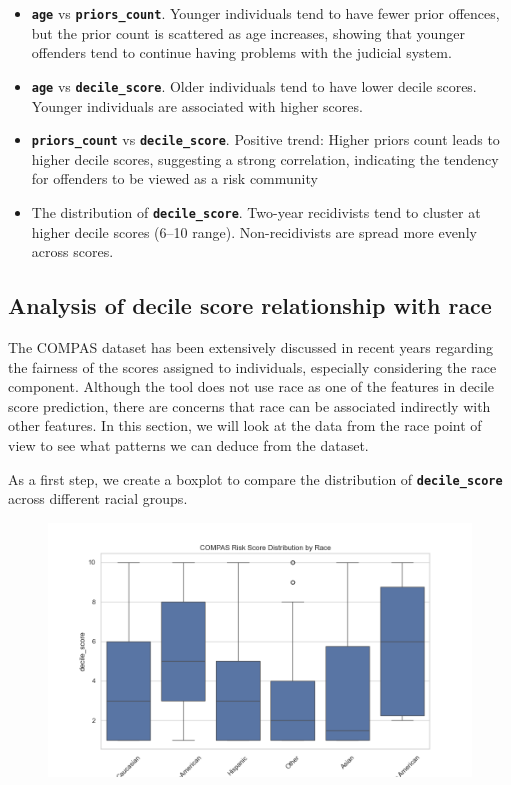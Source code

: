 \begin{itemize}
	\item \textbf{\texttt{age}} vs \textbf{\texttt{priors\_count}}. Younger individuals tend to have fewer prior offences, but the prior count is scattered as age increases, showing that younger offenders tend to continue having problems with the judicial system.
	
	\item \textbf{\texttt{age}} vs \textbf{\texttt{decile\_score}}. Older individuals tend to have lower decile scores. Younger individuals are associated with higher scores.
	
	\item \textbf{\texttt{priors\_count}} vs \textbf{\texttt{decile\_score}}. Positive trend: Higher priors count leads to higher decile scores, suggesting a strong correlation, indicating the tendency for offenders to be viewed as a risk community    
	
	\item The distribution of \textbf{\texttt{decile\_score}}. Two-year recidivists tend to cluster at higher decile scores (6–10 range). Non-recidivists are spread more evenly across scores.        
\end{itemize}



\subsection{Analysis of decile score relationship with race}

The COMPAS dataset has been extensively discussed in recent years regarding the fairness of the scores assigned to individuals, especially considering the race component. Although the tool does not use race as one of the features in decile score prediction, there are concerns that race can be associated indirectly with other features. In this section, we will look at the data from the race point of view to see what patterns we can deduce from the dataset.

As a first step, we create a boxplot to compare the distribution of \textbf{\texttt{decile\_score}} across different racial groups. 

\begin{figure}
	\centering
	\includegraphics[width=0.7\linewidth]{img/decile_score_by_race_boxplot}
	\caption{}
	\label{fig:decilescorebyraceboxplot}
\end{figure}


